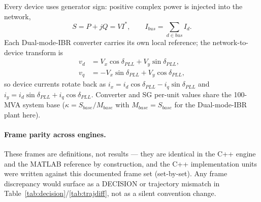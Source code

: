 Every device uses generator sign: positive complex power is injected into the
network,
\[
S=P+jQ=V I^*,\qquad I_{bus}=\sum_{d\in bus} I_d.
\]
Each Dual-mode-IBR converter carries its own local reference; the
network-to-device transform is
\begin{align}
v_d&=V_x\cos\delta_{PLL}+V_y\sin\delta_{PLL},\\
v_q&=-V_x\sin\delta_{PLL}+V_y\cos\delta_{PLL},
\end{align}
so device currents rotate back as
$i_x=i_d\cos\delta_{PLL}-i_q\sin\delta_{PLL}$ and
$i_y=i_d\sin\delta_{PLL}+i_q\cos\delta_{PLL}$.  Converter and SG per-unit
values share the 100-MVA system base ($\kappa=S_{base}/M_{base}$ with
$M_{base}=S_{base}$ for the Dual-mode-IBR plant here).

\paragraph{Frame parity across engines.}
These frames are definitions, not results --- they are identical in the C++
engine and the MATLAB reference by construction, and the C++
implementation units were written against this documented frame set
(set-by-set).  Any frame discrepancy would surface as a DECISION or
trajectory mismatch in Table~\ref{tab:decision}/\ref{tab:trajdiff}, not as
a silent convention change.
